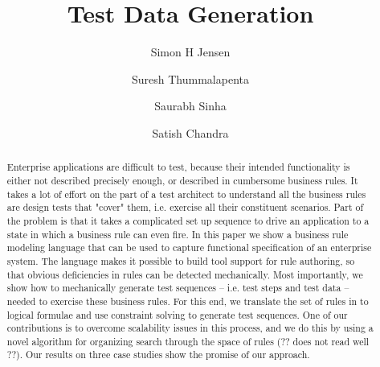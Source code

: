 \documentclass{sig-alternate}
\begin{document}
\newcommand{\ie}{\textit{i.e.,} }
\newcommand{\eg}{\textit{e.g.,} }
\newcommand{\subject}[1]{\texttt{\small #1}}
\newcommand{\rules}{{\mathcal R}}
\newcommand{\tests}{{\mathcal T}}
\newcommand{\elemexists}{\mt{exists}}
\newcommand{\elemenabled}{\mt{enabled}}
\newcommand{\elemexplored}{\mt{explored}}
\newcommand{\note}[1]{{\color{red}$[$ \bf #1 $]$}}
\newcommand{\lang}[1]{\texttt{\scriptsize #1}}


\title{Test Data Generation}

\author{Simon H Jensen \and Suresh Thummalapenta \and Saurabh Sinha \and Satish Chandra}

\maketitle

\begin{abstract}
Enterprise applications are difficult to test, because their intended functionality is either 
not described precisely enough, or described in cumbersome business rules. It takes a lot of 
effort on the part of a test architect to understand all the business rules are design tests 
that "cover" them, i.e. exercise all their constituent scenarios. Part of the problem is that 
it takes a complicated set up sequence to drive an application to a state in which a business 
rule can even fire.  In this paper we show a business rule modeling language that can be used 
to capture functional specification of an enterprise system. The language makes it possible to 
build tool support for rule authoring, so that obvious deficiencies in rules can be detected 
mechanically. Most importantly, we show how to mechanically generate test sequences -- i.e. 
test steps and test data -- needed to exercise these business rules. For this end, we translate 
the set of rules in to logical formulae and use constraint solving to generate test sequences. 
One of our contributions is to overcome scalability issues in this process, and we do this by 
using a novel algorithm for organizing search through the space of rules (?? does not read well ??). 
Our results on three case studies show the promise of our approach.
\end{abstract}










\end{document}
